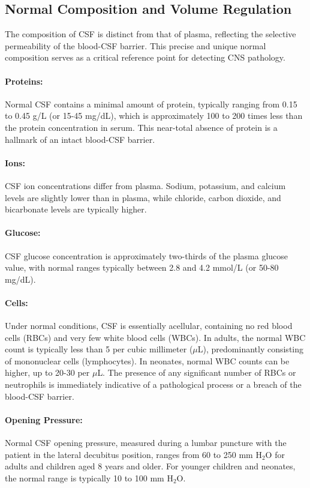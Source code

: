 \subsection{Normal Composition and Volume Regulation}
	
The composition of CSF is distinct from that of plasma, reflecting the selective permeability of the blood-CSF barrier. This precise and unique normal composition serves as a critical reference point for detecting CNS pathology.
	
\paragraph{Proteins:} Normal CSF contains a minimal amount of protein, typically ranging from 0.15 to 0.45 g/L (or 15-45 mg/dL), which is approximately 100 to 200 times less than the protein concentration in serum. This near-total absence of protein is a hallmark of an intact blood-CSF barrier.
	
\paragraph{Ions:} CSF ion concentrations differ from plasma. Sodium, potassium, and calcium levels are slightly lower than in plasma, while chloride, carbon dioxide, and bicarbonate levels are typically higher.
	
\paragraph{Glucose:} CSF glucose concentration is approximately two-thirds of the plasma glucose value, with normal ranges typically between 2.8 and 4.2 mmol/L (or 50-80 mg/dL).
	
\paragraph{Cells:} Under normal conditions, CSF is essentially acellular, containing no red blood cells (RBCs) and very few white blood cells (WBCs). In adults, the normal WBC count is typically less than 5 per cubic millimeter ($\mu$L), predominantly consisting of mononuclear cells (lymphocytes). In neonates, normal WBC counts can be higher, up to 20-30 per $\mu$L. The presence of any significant number of RBCs or neutrophils is immediately indicative of a pathological process or a breach of the blood-CSF barrier.
	
\paragraph{Opening Pressure:} Normal CSF opening pressure, measured during a lumbar puncture with the patient in the lateral decubitus position, ranges from 60 to 250 mm H$_2$O for adults and children aged 8 years and older. For younger children and neonates, the normal range is typically 10 to 100 mm H$_2$O.
	
